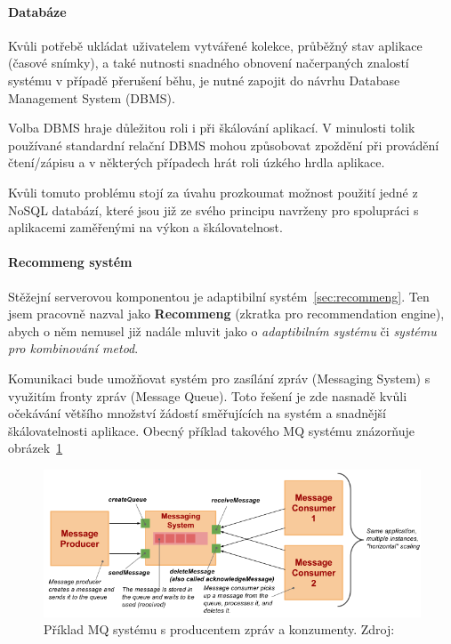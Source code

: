 \documentclass[thesis=M,czech]{FITthesis}[2014/05/07]
\begin{document}
\paragraph{Databáze}

Kvůli potřebě ukládat uživatelem vytvářené kolekce, průběžný stav aplikace (časové snímky), a také nutnosti snadného obnovení načerpaných znalostí systému v případě přerušení běhu, je nutné zapojit do návrhu Database Management System (DBMS).

Volba DBMS hraje důležitou roli i při škálování aplikací. V minulosti tolik používané standardní relační DBMS mohou způsobovat zpoždění při provádění čtení/zápisu a v některých případech hrát roli úzkého hrdla aplikace.

Kvůli tomuto problému stojí za úvahu prozkoumat možnost použití jedné z NoSQL databází, které jsou již ze svého principu navrženy pro spolupráci s aplikacemi zaměřenými na výkon a škálovatelnost.

\paragraph{Recommeng systém}

Stěžejní serverovou komponentou je adaptibilní systém~\ref{sec:recommeng}. Ten jsem pracovně nazval jako \textbf{Recommeng} (zkratka pro recommendation engine), abych o něm nemusel již nadále mluvit jako o \emph{adaptibilním systému} či \emph{systému pro kombinování metod}. 

Komunikaci bude umožňovat systém pro zasílání zpráv (Messaging System) s využitím fronty zpráv (Message Queue). Toto řešení je zde nasnadě kvůli očekávání většího množství žádostí směřujících na systém a snadnější škálovatelnosti aplikace. Obecný příklad takového MQ systému znázorňuje obrázek~\ref{fig:vitvarMq}

\begin{figure}\centering
	\includegraphics[width=1.2\textwidth]{obr/vitvar_mq.png}
 	\caption[Příklad MQ systému s producentem zpráv a konzumenty]{Příklad MQ systému s producentem zpráv a konzumenty. Zdroj: \cite{vitvarMq}}\label{fig:vitvarMq}
\end{figure}	
\end{document}
